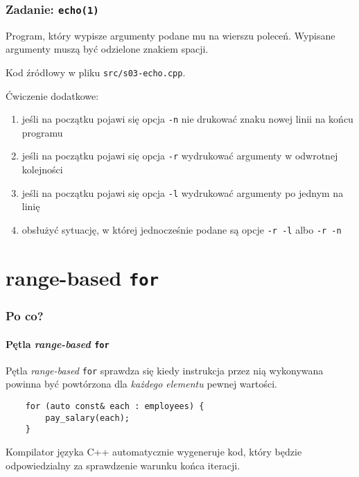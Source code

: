 \documentclass[aspectratio=169]{beamer}
\begin{document}
\begin{frame}[fragile]
    \frametitle{Zadanie: {\tt echo(1)}}
    \label{lecture_exercise_4}

    Program, który wypisze argumenty podane mu na wierszu poleceń. Wypisane
    argumenty muszą być odzielone znakiem spacji.

    Kod źródłowy w pliku {\tt src/s03-echo.cpp}.

    \vspace{1em}

    {\small
    Ćwiczenie dodatkowe:
    \begin{enumerate}
        \item jeśli na początku pojawi się opcja {\tt -n} nie drukować znaku
            nowej linii na końcu programu
        \item jeśli na początku pojawi się opcja {\tt -r} wydrukować
            argumenty w odwrotnej kolejności
        \item jeśli na początku pojawi się opcja {\tt -l} wydrukować argumenty
            po jednym na linię
        \item obsłużyć sytuację, w której jednocześnie podane są opcje {\tt -r
            -l} albo {\tt -r -n}
    \end{enumerate}}
\end{frame}

\section{range-based {\tt for}}

\begin{frame}[fragile]
    \frametitle{Po co?}
    \framesubtitle{Pętla \emph{range-based} {\tt for}}

    Pętla \emph{range-based} {\tt for} sprawdza się kiedy instrukcja przez nią
    wykonywana powinna być powtórzona dla \emph{każdego elementu} pewnej
    wartości.

    \begin{lstlisting}
    for (auto const& each : employees) {
        pay_salary(each);
    }
    \end{lstlisting}

    Kompilator języka C++ automatycznie wygeneruje kod, który będzie
    odpowiedzialny za sprawdzenie warunku końca iteracji.
\end{frame}
\end{document}
